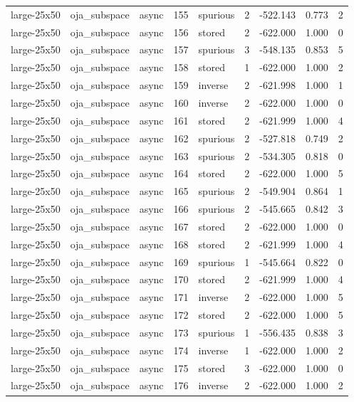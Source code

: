 \begin{tabular}{lllrlrrrr}
large-25x50 & oja\_subspace & async & 155 & spurious & 2 & -522.143 & 0.773 & 2 \\
large-25x50 & oja\_subspace & async & 156 & stored & 2 & -622.000 & 1.000 & 0 \\
large-25x50 & oja\_subspace & async & 157 & spurious & 3 & -548.135 & 0.853 & 5 \\
large-25x50 & oja\_subspace & async & 158 & stored & 1 & -622.000 & 1.000 & 2 \\
large-25x50 & oja\_subspace & async & 159 & inverse & 2 & -621.998 & 1.000 & 1 \\
large-25x50 & oja\_subspace & async & 160 & inverse & 2 & -622.000 & 1.000 & 0 \\
large-25x50 & oja\_subspace & async & 161 & stored & 2 & -621.999 & 1.000 & 4 \\
large-25x50 & oja\_subspace & async & 162 & spurious & 2 & -527.818 & 0.749 & 2 \\
large-25x50 & oja\_subspace & async & 163 & spurious & 2 & -534.305 & 0.818 & 0 \\
large-25x50 & oja\_subspace & async & 164 & stored & 2 & -622.000 & 1.000 & 5 \\
large-25x50 & oja\_subspace & async & 165 & spurious & 2 & -549.904 & 0.864 & 1 \\
large-25x50 & oja\_subspace & async & 166 & spurious & 2 & -545.665 & 0.842 & 3 \\
large-25x50 & oja\_subspace & async & 167 & stored & 2 & -622.000 & 1.000 & 0 \\
large-25x50 & oja\_subspace & async & 168 & stored & 2 & -621.999 & 1.000 & 4 \\
large-25x50 & oja\_subspace & async & 169 & spurious & 1 & -545.664 & 0.822 & 0 \\
large-25x50 & oja\_subspace & async & 170 & stored & 2 & -621.999 & 1.000 & 4 \\
large-25x50 & oja\_subspace & async & 171 & inverse & 2 & -622.000 & 1.000 & 5 \\
large-25x50 & oja\_subspace & async & 172 & stored & 2 & -622.000 & 1.000 & 5 \\
large-25x50 & oja\_subspace & async & 173 & spurious & 1 & -556.435 & 0.838 & 3 \\
large-25x50 & oja\_subspace & async & 174 & inverse & 1 & -622.000 & 1.000 & 2 \\
large-25x50 & oja\_subspace & async & 175 & stored & 3 & -622.000 & 1.000 & 0 \\
large-25x50 & oja\_subspace & async & 176 & inverse & 2 & -622.000 & 1.000 & 2 \\

\end{tabular}
